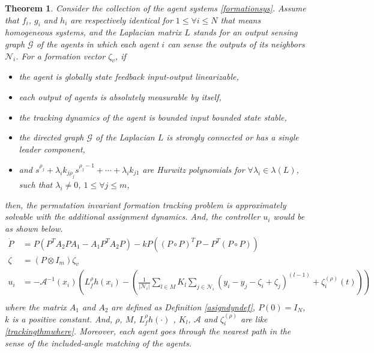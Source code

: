 \documentclass[11pt, a4paper, oneside, openany, reqno]{book}
\newtheorem{theorem}{Theorem}[chapter]
\theoremstyle{definition}
\theoremstyle{remark}
\numberwithin{equation}{chapter} %
\newcommand{\A}{\mathcal{A}}
\newcommand{\NBR}{\mathcal{N}}
\newcommand{\GRP}{\mathcal{G}}
\begin{document}
\begin{theorem}\label{intgthm}
	Consider the collection of the agent systems \eqref{formationsys}. 	
	Assume that $ f_i $, $ g_i $ and $ h_i $ are respectively identical 
	for $ 1 \leq \forall i \leq N $	that means homogeneous systems,
	and	the Laplacian matrix $ L $ stands for an output sensing graph $ \GRP $ of the agents
	in which each agent $ i $ can sense the outputs of its neighbors $ \NBR_i $.
	For a formation vector $ \zeta_v $,
	if \begin{itemize}
		\item 	the agent is globally state feedback input-output linearizable,
		\item	each output of agents is absolutely measurable by itself, 		
		\item	the tracking dynamics of the agent is bounded input bounded state stable,
		\item	the directed graph $ \GRP $ of the Laplacian $ L $ is 
				strongly connected or has a single leader component,
		\item	and $ s^{\rho_j} + \lambda_i k_{j\rho_j} s^{\rho_j-1} + \cdots + \lambda_i k_{j1} $ 
				are Hurwitz polynomials for $ \forall \lambda_i \in \lambda(L) $, 				
				such that $ \lambda_i \neq 0 $, $ 1 \leq \forall j \leq m $,
	\end{itemize}
	then, the permutation invariant formation tracking problem is approximately solvable 
	with the additional assignment dynamics. 
	And, the controller $ u_i $ would be as shown below.
	\begin{equation}\begin{split}\label{integratethm}
		\dot{P} &= P \left( P^T A_2 P A_1 - A_1 P^T A_2 P \right)
					-k P \left( (P \circ P)^T P -P^T (P \circ P) \right) \\
		\zeta &= \left( P \otimes I_m \right) \zeta_v \\
		u_i &= -\A^{-1}(x_i) \left( L_f^\rho h(x_i)			
		    - \left( \frac{1}{\vert \NBR_i \vert} \sum_{l \in M}
				K_{l}  \sum_{j \in \NBR_i } (y_i - y_j -  \zeta_{i} + \zeta_{j}) ^{(l-1)}  
				+  \zeta_{i}^{(\rho)}(t) \right)\right)\\			
	\end{split}\end{equation} 	
	where the matrix $ A_1 $ and $ A_2 $ are defined as Definition \ref{asigndyndef},
	$ P(0) = I_N $, $ k $ is a positive constant. And,
	$ \rho $, $ M $, $ L_f^\rho h(\cdot) $ , $ K_l $, $ \A $ 
	and $ \zeta_{i}^{(\rho)} $ are like \eqref{trackingthmwhere}.
	Moreover, each agent goes through the nearest path in the sense of
	the included-angle matching of the agents. 
\end{theorem}
\end{document}
